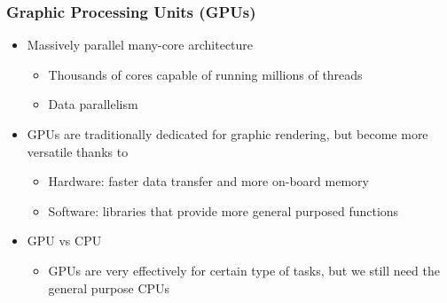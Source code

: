 \documentclass[10pt,t]{beamer}
\begin{document}
\begin{frame}
\frametitle{Graphic Processing Units (GPUs)}
\begin{itemize}
\item Massively parallel many-core architecture
\begin{itemize}
\item Thousands of cores capable of running millions of threads
\item Data parallelism
\end{itemize}
\item GPUs are traditionally dedicated for graphic rendering, but
become more versatile thanks to
\begin{itemize}
\item Hardware: faster data transfer and more on-board memory
\item Software: libraries that provide more general purposed
functions
\end{itemize}
\item GPU vs CPU
\begin{itemize}
\item GPUs are very effectively for certain type of tasks, but we still need the general purpose CPUs
\end{itemize}
\end{itemize}
\end{frame}
\end{document}
